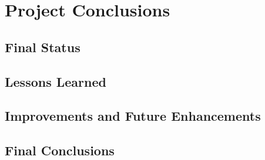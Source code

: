 \chapter{Project Conclusions}

\label{chap:conclusions}

\section{Final Status}

\label{sec:fstat}



\section{Lessons Learned}



\section{Improvements and Future Enhancements}



\section{Final Conclusions}



